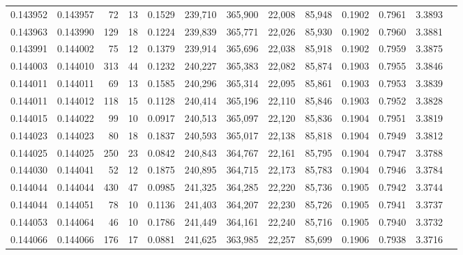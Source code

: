 \begin{tabular}{rrrrrrrrrrrrr}
0.143952 & 0.143957 &    72 &  13 &                                     0.1529 & 239,710 & 365,900 &  22,008 &  85,948 & 0.1902 & 0.7961 & 3.3893 \\
0.143963 & 0.143990 &   129 &  18 &                                     0.1224 & 239,839 & 365,771 &  22,026 &  85,930 & 0.1902 & 0.7960 & 3.3881 \\
0.143991 & 0.144002 &    75 &  12 &                                     0.1379 & 239,914 & 365,696 &  22,038 &  85,918 & 0.1902 & 0.7959 & 3.3875 \\
0.144003 & 0.144010 &   313 &  44 &                                     0.1232 & 240,227 & 365,383 &  22,082 &  85,874 & 0.1903 & 0.7955 & 3.3846 \\
0.144011 & 0.144011 &    69 &  13 &                                     0.1585 & 240,296 & 365,314 &  22,095 &  85,861 & 0.1903 & 0.7953 & 3.3839 \\
0.144011 & 0.144012 &   118 &  15 &                                     0.1128 & 240,414 & 365,196 &  22,110 &  85,846 & 0.1903 & 0.7952 & 3.3828 \\
0.144015 & 0.144022 &    99 &  10 &                                     0.0917 & 240,513 & 365,097 &  22,120 &  85,836 & 0.1904 & 0.7951 & 3.3819 \\
0.144023 & 0.144023 &    80 &  18 &                                     0.1837 & 240,593 & 365,017 &  22,138 &  85,818 & 0.1904 & 0.7949 & 3.3812 \\
0.144025 & 0.144025 &   250 &  23 &                                     0.0842 & 240,843 & 364,767 &  22,161 &  85,795 & 0.1904 & 0.7947 & 3.3788 \\
0.144030 & 0.144041 &    52 &  12 &                                     0.1875 & 240,895 & 364,715 &  22,173 &  85,783 & 0.1904 & 0.7946 & 3.3784 \\
0.144044 & 0.144044 &   430 &  47 &                                     0.0985 & 241,325 & 364,285 &  22,220 &  85,736 & 0.1905 & 0.7942 & 3.3744 \\
0.144044 & 0.144051 &    78 &  10 &                                     0.1136 & 241,403 & 364,207 &  22,230 &  85,726 & 0.1905 & 0.7941 & 3.3737 \\
0.144053 & 0.144064 &    46 &  10 &                                     0.1786 & 241,449 & 364,161 &  22,240 &  85,716 & 0.1905 & 0.7940 & 3.3732 \\
0.144066 & 0.144066 &   176 &  17 &                                     0.0881 & 241,625 & 363,985 &  22,257 &  85,699 & 0.1906 & 0.7938 & 3.3716 \\

\end{tabular}
